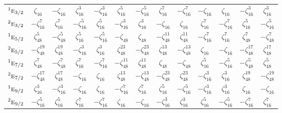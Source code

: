 \documentclass[10pt,a4paper]{article}
\numberwithin{equation}{section}
\newcommand{\irr}[1]{\text{\normalfont\scshape #1}}
\newcommand{\conjpair}[1]{{}^{#1}}
\newcommand{\rootunity}[1]{\zeta_{#1}}
\begin{document}
{\begin{longtable}{@{}lcccccccccccc@{}}
$\conjpair{1}\irr{e}_{3/2}$ & $\rootunity{16}$ & $-\rootunity{16}$ & $\rootunity{16}^{3}$ & $-\rootunity{16}^{3}$ & $\rootunity{16}^{5}$ & $-\rootunity{16}^{5}$ & $\rootunity{16}^{7}$ & $-\rootunity{16}^{7}$ & $-\rootunity{16}$ & $\rootunity{16}$ & $-\rootunity{16}^{3}$ & $\rootunity{16}^{3}$\\
$\conjpair{2}\irr{e}_{3/2}$ & $-\rootunity{16}^{7}$ & $\rootunity{16}^{7}$ & $-\rootunity{16}^{5}$ & $\rootunity{16}^{5}$ & $-\rootunity{16}^{3}$ & $\rootunity{16}^{3}$ & $-\rootunity{16}$ & $\rootunity{16}$ & $\rootunity{16}^{7}$ & $-\rootunity{16}^{7}$ & $\rootunity{16}^{5}$ & $-\rootunity{16}^{5}$\\
$\conjpair{1}\irr{e}_{5/2}$ & $\rootunity{48}^{5}$ & $-\rootunity{48}^{5}$ & $\rootunity{16}^{5}$ & $-\rootunity{16}^{5}$ & $-\rootunity{48}$ & $\rootunity{48}$ & $-\rootunity{48}^{11}$ & $\rootunity{48}^{11}$ & $-\rootunity{16}^{7}$ & $\rootunity{16}^{7}$ & $\rootunity{48}^{7}$ & $-\rootunity{48}^{7}$\\
$\conjpair{2}\irr{e}_{5/2}$ & $-\rootunity{48}^{19}$ & $\rootunity{48}^{19}$ & $-\rootunity{16}^{3}$ & $\rootunity{16}^{3}$ & $\rootunity{48}^{23}$ & $-\rootunity{48}^{23}$ & $\rootunity{48}^{13}$ & $-\rootunity{48}^{13}$ & $\rootunity{16}$ & $-\rootunity{16}$ & $-\rootunity{48}^{17}$ & $\rootunity{48}^{17}$\\
$\conjpair{1}\irr{e}_{7/2}$ & $\rootunity{48}^{7}$ & $-\rootunity{48}^{7}$ & $\rootunity{16}^{7}$ & $-\rootunity{16}^{7}$ & $-\rootunity{48}^{11}$ & $\rootunity{48}^{11}$ & $\rootunity{48}$ & $-\rootunity{48}$ & $\rootunity{16}^{5}$ & $-\rootunity{16}^{5}$ & $-\rootunity{48}^{5}$ & $\rootunity{48}^{5}$\\
$\conjpair{2}\irr{e}_{7/2}$ & $-\rootunity{48}^{17}$ & $\rootunity{48}^{17}$ & $-\rootunity{16}$ & $\rootunity{16}$ & $\rootunity{48}^{13}$ & $-\rootunity{48}^{13}$ & $-\rootunity{48}^{23}$ & $\rootunity{48}^{23}$ & $-\rootunity{16}^{3}$ & $\rootunity{16}^{3}$ & $\rootunity{48}^{19}$ & $-\rootunity{48}^{19}$\\
$\conjpair{1}\irr{e}_{9/2}$ & $\rootunity{16}^{3}$ & $-\rootunity{16}^{3}$ & $-\rootunity{16}$ & $\rootunity{16}$ & $-\rootunity{16}^{7}$ & $\rootunity{16}^{7}$ & $\rootunity{16}^{5}$ & $-\rootunity{16}^{5}$ & $-\rootunity{16}^{3}$ & $\rootunity{16}^{3}$ & $\rootunity{16}$ & $-\rootunity{16}$\\
$\conjpair{2}\irr{e}_{9/2}$ & $-\rootunity{16}^{5}$ & $\rootunity{16}^{5}$ & $\rootunity{16}^{7}$ & $-\rootunity{16}^{7}$ & $\rootunity{16}$ & $-\rootunity{16}$ & $-\rootunity{16}^{3}$ & $\rootunity{16}^{3}$ & $\rootunity{16}^{5}$ & $-\rootunity{16}^{5}$ & $-\rootunity{16}^{7}$ & $\rootunity{16}^{7}$\\

\end{longtable}}
\end{document}
